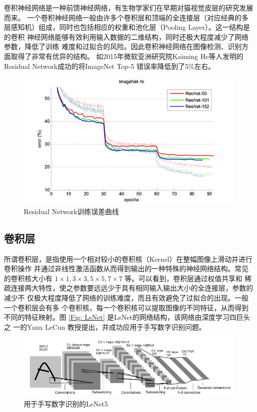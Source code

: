 卷积神经网络是一种前馈神经网络，有生物学家们在早期对猫视觉皮层的研究发展而来。
一个卷积神经网络一般由许多个卷积层和顶端的全连接层（对应经典的多
层感知机）组成，同时也包括相应的权重和池化层（Pooling Layer）。这一结构是的卷积
神经网络能够有效利用输入数据的二维结构，同时还极大程度减少了网络参数，降低了训练
难度和过拟合的风险。因此卷积神经网络在图像检测、识别方面取得了非常有优异的结构。
如2015年微软亚洲研究院Kaiming He等人发明的Residual Network成功的将ImageNet Top-5
错误率降低到了5\%左右\cite{He:2015tt}\cite{He:2016tq}。

\begin{figure}[ht]
  \centering
  \includegraphics[width=0.8\linewidth]{./Figure/ResNetTrainError.jpg}
  \caption{Residual Network训练误差曲线\cite{He:2015tt}}
\end{figure}

\subsection{卷积层}

所谓卷积层，是指使用一个相对较小的卷积核（Kernel）在整幅图像上滑动并进行卷积操作
并通过非线性激活函数从而得到输出的一种特殊的神经网络结构。常见的卷积核大小有 $1
\times 1, 3 \times 3, 5 \times 5, 7 \times 7$ 等。可以看到，卷积层通过权值共享和
稀疏连接两大特性，使之参数要远远少于具有相同输入输出大小的全连接层，参数的减少不
仅极大程度降低了网络的训练难度，而且有效避免了过拟合的出现。一般一个卷积层会有多
个卷积核，每一个卷积核可以提取图像的不同特征，从而得到不同的特征映射。图
\ref{Fig: LeNet} 是LeNet\cite{LeCun:1990vp}的网络结构，该网络由深度学习四巨头之
一的Yann LeCun 教授提出，并成功应用于手写数字识别问题\cite{LeCun:1990vp}。

\begin{figure}[ht]
  \centering
  \includegraphics[width=0.8\linewidth]{./Figure/LeNet.png}
  \caption{用于手写数字识别的LeNet5\cite{LeCun:1990vp}} \label{Fig:LeNet}
\end{figure}

